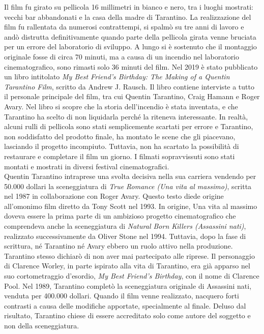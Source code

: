 \documentclass[12pt]{article} %
\begin{document}
\begin{flushleft}
    Il film fu girato su pellicola 16 millimetri in bianco e nero,  tra i luoghi mostrati: vecchi bar abbandonati e la casa della madre di Tarantino. La realizzazione del film fu rallentata da numerosi contrattempi, si spalmò su tre anni di lavoro e andò distrutta definitivamente quando parte della pellicola girata venne bruciata per un errore del laboratorio di sviluppo.
    A lungo si è sostenuto che il montaggio originale fosse di circa 70 minuti, ma a causa di un incendio nel laboratorio cinematografico, sono rimasti solo 36 minuti del film. Nel 2019 è stato pubblicato un libro intitolato \textit{My Best Friend's Birthday: The Making of a Quentin Tarantino Film}, scritto da Andrew J. Rausch. Il libro contiene interviste a tutto il personale principale del film, tra cui Quentin Tarantino, Craig Hamann e Roger Avary. Nel libro si scopre che la storia dell'incendio è stata inventata, e che Tarantino ha scelto di non liquidarla perché la riteneva interessante. In realtà, alcuni rulli di pellicola sono stati semplicemente scartati per errore e Tarantino, non soddisfatto del prodotto finale, ha montato le scene che gli piacevano, lasciando il progetto incompiuto. Tuttavia, non ha scartato la possibilità di restaurare e completare il film un giorno. I filmati sopravvissuti sono stati montati e mostrati in diversi festival cinematografici.
    \\\vspace{1cm}Quentin Tarantino intraprese una svolta decisiva nella sua carriera vendendo per 50.000 dollari la sceneggiatura di \textit{True Romance (Una vita al massimo)}, scritta nel 1987 in collaborazione con Roger Avary. Questo testo diede origine all’omonimo film diretto da Tony Scott nel 1993.
    In origine, Una vita al massimo doveva essere la prima parte di un ambizioso progetto cinematografico che comprendeva anche la sceneggiatura di \textit{Natural Born Killers (Assassini nati)}, realizzato successivamente da Oliver Stone nel 1994. Tuttavia, dopo la fase di scrittura, né Tarantino né Avary ebbero un ruolo attivo nella produzione. Tarantino stesso dichiarò di non aver mai partecipato alle riprese.
    Il personaggio di Clarence Worley, in parte ispirato alla vita di Tarantino, era già apparso nel suo cortometraggio d’esordio, \textit{My Best Friend's Birthday}, con il nome di Clarence Pool.
    Nel 1989, Tarantino completò la sceneggiatura originale di Assassini nati, venduta per 400.000 dollari. Quando il film venne realizzato, nacquero forti contrasti a causa delle modifiche apportate, specialmente al finale. Deluso dal risultato, Tarantino chiese di essere accreditato solo come autore del soggetto e non della sceneggiatura.

\end{flushleft}
\end{document}
